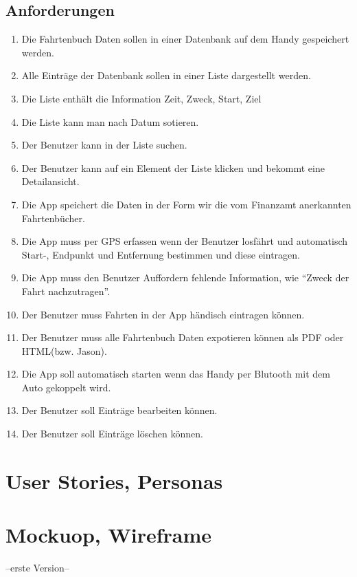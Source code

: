 \documentclass[a4paper]{article}
\begin{document}
\subsection{Anforderungen}
\begin{enumerate}
	\item Die Fahrtenbuch Daten sollen in einer Datenbank auf dem Handy gespeichert werden.
	\item Alle Einträge der Datenbank sollen in einer Liste dargestellt werden.
	\item Die Liste enthält die Information Zeit, Zweck, Start, Ziel
	\item Die Liste kann man nach Datum sotieren.
	\item Der Benutzer kann in der Liste suchen.
	\item Der Benutzer kann auf ein Element der Liste klicken und bekommt eine Detailansicht.
	\item Die App speichert die Daten in der Form wir die vom Finanzamt anerkannten Fahrtenbücher.
	\item Die App muss per GPS erfassen wenn der Benutzer losfährt und automatisch Start-, Endpunkt und Entfernung bestimmen und diese eintragen.
	\item Die App muss den Benutzer Auffordern fehlende Information, wie \enquote{Zweck der Fahrt nachzutragen}.
	\item Der Benutzer muss Fahrten in der App händisch eintragen können.
	\item Der Benutzer muss alle Fahrtenbuch Daten expotieren können als PDF oder HTML(bzw. Jason).
	\item Die App soll automatisch starten wenn das Handy per Blutooth mit dem Auto gekoppelt wird.
	\item Der Benutzer soll Einträge bearbeiten können.
	\item Der Benutzer soll Einträge löschen können.
\end{enumerate}

\section{User Stories, Personas}

\section{Mockuop, Wireframe}
--erste Version--
\end{document}
